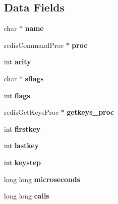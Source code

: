 \subsection*{Data Fields}
\begin{DoxyCompactItemize}
\item 
\mbox{\label{structredisCommand_ae4526b00fd9f55a6f6a9eab29c536116}} 
char $\ast$ {\bfseries name}
\item 
\mbox{\label{structredisCommand_a24f22d9b254c49ba9fedf8f260ba6ad8}} 
redis\+Command\+Proc $\ast$ {\bfseries proc}
\item 
\mbox{\label{structredisCommand_a9c21ad3c5edaf7afa62d2cc612077fda}} 
int {\bfseries arity}
\item 
\mbox{\label{structredisCommand_aa42bde2bbb812fa8fa4e2645fd154215}} 
char $\ast$ {\bfseries sflags}
\item 
\mbox{\label{structredisCommand_ac2f449728b059d5f64079948199dc928}} 
int {\bfseries flags}
\item 
\mbox{\label{structredisCommand_ab91d7b447701a9cd5925d93b43df24e9}} 
redis\+Get\+Keys\+Proc $\ast$ {\bfseries getkeys\+\_\+proc}
\item 
\mbox{\label{structredisCommand_a7ec037012cba315bc452906108ed9e57}} 
int {\bfseries firstkey}
\item 
\mbox{\label{structredisCommand_ac0fc65a03ddc4c8c766e2907d72d1d51}} 
int {\bfseries lastkey}
\item 
\mbox{\label{structredisCommand_a58117d4ef5caddb89e70cac7f98857d9}} 
int {\bfseries keystep}
\item 
\mbox{\label{structredisCommand_aaea295b9c3b26a4e8133cf0d3b110ccf}} 
long long {\bfseries microseconds}
\item 
\mbox{\label{structredisCommand_a02752f0e9997214352bef75edc46a6ab}} 
long long {\bfseries calls}
\end{DoxyCompactItemize}


